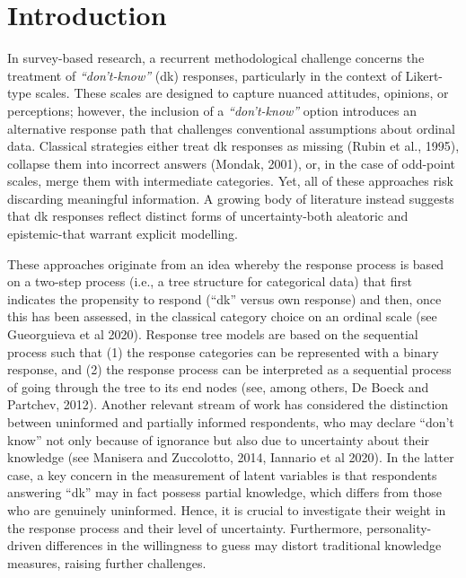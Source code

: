 \documentclass[submit]{smj}
\begin{document}
\maketitle

\section{Introduction}

In survey-based research, a recurrent methodological challenge concerns the treatment of {\it \enquote{don't-know}} (dk) responses, particularly in the context of Likert-type scales. These scales are designed to capture nuanced attitudes, opinions, or perceptions; however, the inclusion of a {\it \enquote{don't-know}} option introduces an alternative response path that challenges conventional assumptions about ordinal data. Classical strategies either treat dk responses as missing (Rubin et al., 1995), collapse them into incorrect answers (Mondak, 2001), or, in the case of odd-point scales, merge them with intermediate categories. Yet, all of these approaches risk discarding meaningful information. A growing body of literature instead suggests that dk responses reflect distinct forms of uncertainty-both aleatoric and epistemic-that warrant explicit modelling.

These approaches originate from an idea whereby the response process is based on a two-step process (i.e., a tree structure for categorical data) that first indicates the propensity to respond (\enquote{dk} versus own response) and then, once this has been assessed, in the classical category choice on an ordinal scale (see Gueorguieva et al 2020). Response tree models are based on the sequential process such that (1) the response categories can
be represented with a binary response, and (2) the response process can be interpreted
as a sequential process of going through the tree to its end nodes (see, among others, De Boeck and Partchev, 2012). Another relevant stream of work has considered the distinction between uninformed and
partially informed respondents, who may declare \enquote{don't know} not only because of ignorance but also due to uncertainty about their knowledge
 (see Manisera and Zuccolotto, 2014, Iannario et al 2020).
 In the latter case, a key concern in the measurement of latent variables is that respondents answering \enquote{dk} may in fact possess partial knowledge, which differs from those who are genuinely uninformed. Hence, it is crucial to investigate their weight in the response process and their level of uncertainty. Furthermore, personality-driven differences in the willingness to guess may distort traditional knowledge measures, raising further challenges.
\end{document}
